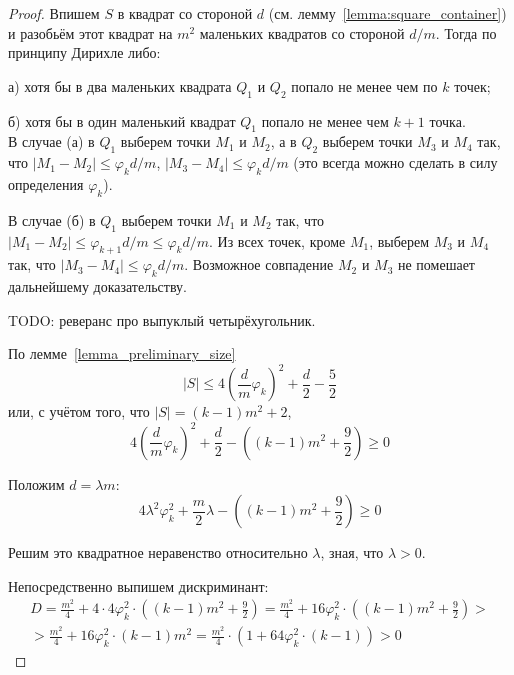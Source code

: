 \begin{proof}
	Впишем $S$ в квадрат со стороной $d$ (см. лемму~\ref{lemma:square_container})
	и разобьём этот квадрат на $m^2$ маленьких квадратов со стороной $d/m$.
	Тогда по принципу Дирихле либо:

	а) хотя бы в два маленьких квадрата $Q_1$ и $Q_2$ попало не менее чем по $k$ точек;

	б) хотя бы в один маленький квадрат $Q_1$ попало не менее чем $k+1$ точка.
	\\
	В случае (а) в $Q_1$ выберем точки $M_1$ и $M_2$,
	а в $Q_2$ выберем точки $M_3$ и $M_4$
	так, что $|M_1 - M_2| \leq \varphi_k d /m$, $|M_3 - M_4| \leq \varphi_k d/m$
	(это всегда можно сделать в силу определения $\varphi_k$).

	В случае (б) в $Q_1$ выберем точки $M_1$ и $M_2$ так, что
	$|M_1 - M_2| \leq \varphi_{k+1} d /m \leq \varphi_k d /m$.
	Из всех точек, кроме $M_1$, выберем $M_3$ и $M_4$ так, что
	$|M_3 - M_4| \leq \varphi_k d/m$.
	Возможное совпадение $M_2$ и $M_3$ не помешает дальнейшему доказательству.

	TODO: реверанс про выпуклый четырёхугольник.

	По лемме~\ref{lemma_preliminary_size}
	\begin{equation}
		|S| \leq 4 \left( \frac{d}{m} \varphi_k \right)^2 + \frac{d}{2} - \frac{5}{2}
	\end{equation}
	или, с учётом того, что $ |S| = (k-1)m^2 + 2$,
	\begin{equation}
		 4 \left( \frac{d}{m} \varphi_k \right)^2 + \frac{d}{2} - \left( (k-1)m^2 + \frac{9}{2}\right) \geq 0
	\end{equation}

	Положим $d = \lambda m$:
	\begin{equation}
		 4 \lambda^2 \varphi_k^2 + \frac{m}{2} \lambda - \left( (k-1)m^2 + \frac{9}{2}\right) \geq 0
	\end{equation}

	Решим это квадратное неравенство относительно $\lambda$,
	зная, что $\lambda > 0$.

	Непосредственно выпишем дискриминант:
	\begin{multline}
		D =
		\frac{m^2}{4} + 4 \cdot 4 \varphi_k^2 \cdot \left( (k-1)m^2 + \frac{9}{2}\right)
		=
		\frac{m^2}{4} + 16 \varphi_k^2 \cdot \left( (k-1)m^2 + \frac{9}{2}\right)
		>\\>
		\frac{m^2}{4} + 16 \varphi_k^2 \cdot (k-1)m^2
		=
		\frac{m^2}{4} \cdot (1 + 64 \varphi_k^2 \cdot (k-1))
		> 0
	\end{multline}


\end{proof}
